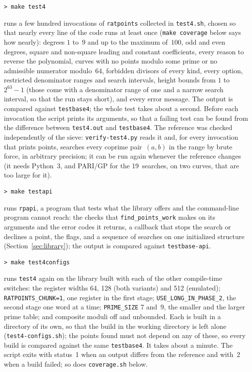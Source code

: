 \documentclass[12pt,a4paper,oneside]{amsart}
\begin{document}
\begin{verbatim}
> make test4
\end{verbatim}
runs a few hundred invocations of \texttt{ratpoints} collected in \texttt{test4.sh},
chosen so that nearly every line of the code runs at
least once (\texttt{make coverage} below says how nearly): degrees $1$ to~$9$ and up to the maximum of~$100$,
odd and even degrees, square and non-square
leading and constant coefficients, every reason to reverse the polynomial,
curves with no points modulo some prime or no admissible numerator modulo~$64$,
forbidden divisors of every kind, every option, restricted denominator
ranges and search intervals, height bounds from $1$ to~$2^{63}-1$ (those come
with a denominator range of one and a narrow search interval, so that the
run stays short), and every error message.  The output is compared against
\texttt{testbase4}; the whole test takes about a second.  Before each invocation
the script prints its arguments, so that a failing test can be found from
the difference between \texttt{test4.out} and \texttt{testbase4}.  The
reference was checked independently of the sieve: \texttt{verify-test4.py}
reads it and, for every invocation that prints points, searches every
coprime pair~$(a, b)$ in the range by brute force, in arbitrary precision;
it can be run again whenever the reference changes (it needs Python~3, and
PARI/GP for the 19~searches, on two curves, that are too large for it).

\begin{verbatim}
> make testapi
\end{verbatim}
runs \texttt{rpapi}, a program that tests what the library offers and the
command-line program cannot reach: the checks that
\texttt{find\_points\_work} makes on its arguments and the error codes it
returns, a callback that stops the search or declines a point, the flags,
and a sequence of searches on one initialized structure
(Section~\ref{sec:library}); the output is compared against
\texttt{testbase-api}.

\begin{verbatim}
> make test4configs
\end{verbatim}
runs \texttt{test4} again on the library built with each of the other
compile-time switches: the register widths 64, 128 (both variants) and
512 (emulated); \texttt{RATPOINTS\_CHUNK=1}, one register in the first
stage; \texttt{USE\_LONG\_IN\_PHASE\_2}, the second stage one word at a
time; \texttt{PRIME\_SIZE} 7 and~9, the smaller and the larger prime table;
and composite moduli off and unbounded.  Each is
built in a directory of its own, so that the build in the working
directory is left alone (\texttt{test4-configs.sh}); the points found
must not depend on any of these, so every build is compared against the
same \texttt{testbase4}. It takes about a minute.
The script exits with status~1 when an output
differs from the reference and with~2 when a build failed; so does
\texttt{coverage.sh} below.
\end{document}
